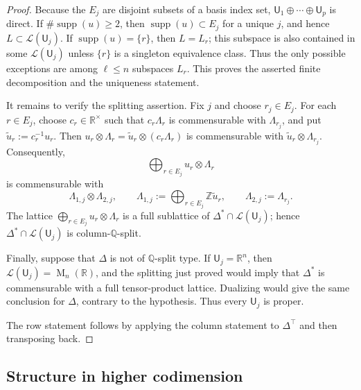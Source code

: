 \documentclass[reqno,11pt]{amsart}
\numberwithin{equation}{section}
\theoremstyle{definition}
\theoremstyle{remark}
\newcommand{\op}{\operatorname}
\newcommand{\R}{\mathbb R}
\newcommand{\M}{\op{M}}
\begin{document}
\begin{proof}
Because the $E_j$ are disjoint subsets of a basis index set,
$\mathsf U_1\oplus\cdots\oplus \mathsf U_p$ is direct. If
$\#\operatorname{supp}(u)\ge2$, then
$\operatorname{supp}(u)\subset E_j$ for a unique $j$, and hence
$L\subset \mathcal{L}(\mathsf U_j)$. If $\operatorname{supp}(u)=\{r\}$, then
$L={L}_r$; this subspace is also contained in some $\mathcal{L}(\mathsf U_j)$ unless
$\{r\}$ is a singleton equivalence class. Thus the only possible exceptions
are among $\ell\le n$ subspaces $L_r$. This proves the
asserted finite decomposition and the uniqueness statement.

It remains to verify the splitting assertion. Fix $j$ and choose $r_j\in E_j$. For
each $r\in E_j$, choose $c_r\in\R^\times$ such that
$c_r\Lambda_r$ is commensurable with $\Lambda_{r_j}$, and put
$\widetilde u_r:=c_r^{-1}u_r$. Then $u_r\otimes\Lambda_r
=
\widetilde u_r\otimes(c_r\Lambda_r)$
is commensurable with
$\widetilde u_r\otimes\Lambda_{r_j}$. Consequently,
$$
\bigoplus_{r\in E_j}u_r\otimes\Lambda_r
$$
is commensurable with
$$
\Lambda_{1,j}\otimes\Lambda_{2,j},
\qquad
\Lambda_{1,j}:=\bigoplus_{r\in E_j}\mathbb Z\widetilde u_r,
\qquad
\Lambda_{2,j}:=\Lambda_{r_j}.
$$
The lattice $\bigoplus_{r\in E_j}u_r\otimes\Lambda_r$ is a full sublattice of
$\Delta^*\cap \mathcal{L}(\mathsf U_j)$; hence $\Delta^*\cap \mathcal{L}(\mathsf U_j)$ is
column-$\mathbb Q$-split.

Finally, suppose that $\Delta$ is not of $\mathbb Q$-split type. If
$\mathsf U_j=\R^n$, then $\mathcal{L}(\mathsf U_j)=\M_n(\R)$, and the splitting just proved
would imply that $\Delta^*$ is commensurable with a full tensor-product lattice.
Dualizing would give the same conclusion for $\Delta$, contrary to the
hypothesis. Thus every $\mathsf U_j$ is proper.

The row statement follows by applying the column statement to
$\Delta^{\intercal}$ and then transposing back.
\end{proof}

\subsection{Structure in higher codimension}
\end{document}
